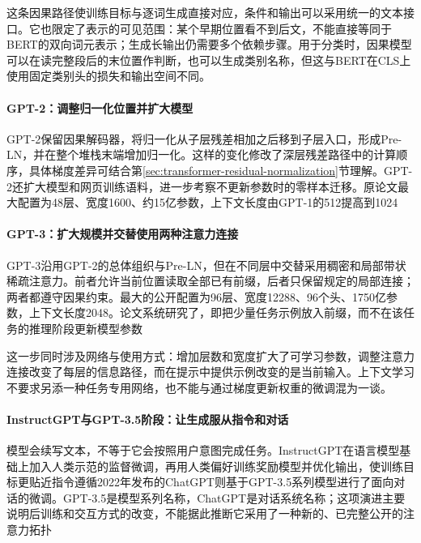 这条因果路径使训练目标与逐词生成直接对应，条件和输出可以采用统一的文本接口。它也限定了表示的可见范围：某个早期位置看不到后文，不能直接等同于BERT的双向词元表示；生成长输出仍需要多个依赖步骤。用于分类时，因果模型可以在读完整段后的末位置作判断，也可以生成类别名称，但这与BERT在CLS上使用固定类别头的损失和输出空间不同。

\paragraph{GPT-2：调整归一化位置并扩大模型}

GPT-2保留因果解码器，将归一化从子层残差相加之后移到子层入口，形成Pre-LN，并在整个堆栈末端增加归一化。这样的变化修改了深层残差路径中的计算顺序，具体梯度差异可结合第\ref{sec:transformer-residual-normalization}节理解。GPT-2还扩大模型和网页训练语料，进一步考察不更新参数时的零样本迁移。原论文最大配置为48层、宽度1600、约15亿参数，上下文长度由GPT-1的512提高到1024

\Needspace{190mm}
\paragraph{GPT-3：扩大规模并交替使用两种注意力连接}

GPT-3沿用GPT-2的总体组织与Pre-LN，但在不同层中交替采用稠密和局部带状稀疏注意力。前者允许当前位置读取全部已有前缀，后者只保留规定的局部连接；两者都遵守因果约束。最大的公开配置为96层、宽度12288、96个头、1750亿参数，上下文长度2048。论文系统研究了，即把少量任务示例放入前缀，而不在该任务的推理阶段更新模型参数

这一步同时涉及网络与使用方式：增加层数和宽度扩大了可学习参数，调整注意力连接改变了每层的信息路径，而在提示中提供示例改变的是当前输入。上下文学习不要求另添一种任务专用网络，也不能与通过梯度更新权重的微调混为一谈。

\Needspace{165mm}
\paragraph{InstructGPT与GPT-3.5阶段：让生成服从指令和对话}

模型会续写文本，不等于它会按照用户意图完成任务。InstructGPT在语言模型基础上加入人类示范的监督微调，再用人类偏好训练奖励模型并优化输出，使训练目标更贴近指令遵循2022年发布的ChatGPT则基于GPT-3.5系列模型进行了面向对话的微调。GPT-3.5是模型系列名称，ChatGPT是对话系统名称；这项演进主要说明后训练和交互方式的改变，不能据此推断它采用了一种新的、已完整公开的注意力拓扑


